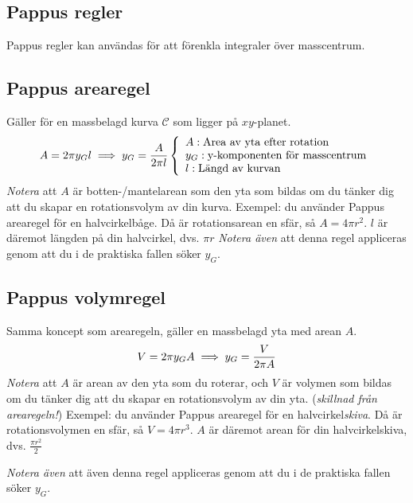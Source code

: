 \documentclass{article}
\newenvironment{ankiflashcard}[1]{}{}
\begin{document}
\begin{paracol}{2}
\section{Pappus regler}
Pappus regler kan användas för att förenkla integraler över masscentrum.

\begin{ankiflashcard}{Formulera Pappus arearegel.}
\subsection{Pappus arearegel}
Gäller för en massbelagd kurva $\mathcal C$ som ligger på $xy$-planet.
$$
A=2\pi y_G l\\ \implies y_G = \frac{A}{2\pi l}\left\{\begin{array}{l}A: \text{Area av yta efter rotation} \\y_G: \text{y-komponenten för masscentrum} \\l: \text{Längd av kurvan} \\\end{array}\right.
$$
\textit{Notera} att $A$ är botten-/mantelarean som den yta som bildas om du tänker dig att du skapar en rotationsvolym av din kurva.
Exempel: du använder Pappus arearegel för en halvcirkelbåge. Då är rotationsarean en sfär, så $A = 4\pi r^2$. $l$ är däremot längden på din halvcirkel, dvs. $\pi r$
\textit{Notera även} att denna regel appliceras genom att du i de praktiska fallen söker $y_G$.
\end{ankiflashcard}

\begin{ankiflashcard}{Formulera Pappus volymregel.}
    \subsection{Pappus volymregel}
Samma koncept som arearegeln, gäller en massbelagd yta med arean $A$.
$$
V = 2\pi y_G A\\
\implies y_G = \frac{V}{2\pi A}
$$
\textit{Notera} att $A$ är arean av den yta som du roterar, och $V$ är volymen som bildas om du tänker dig att du skapar en rotationsvolym av din yta.
(\textit{skillnad från arearegeln!})
Exempel: du använder Pappus arearegel för en halvcirkel\textit{skiva}. Då är rotationsvolymen en sfär, så $V = 4\pi r^3$. $A$ är däremot arean för din halvcirkelskiva, dvs. $\frac{\pi r^2}{2}$


\textit{Notera även} att även denna regel appliceras genom att du i de praktiska fallen söker $y_G$.
\end{ankiflashcard}


\end{paracol}
\end{document}
